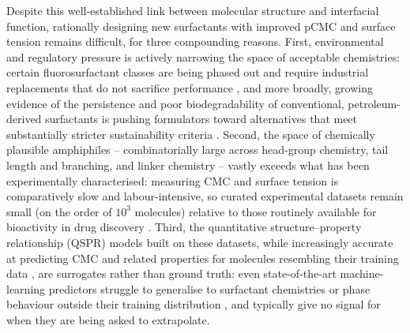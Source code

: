 \documentclass[11pt]{aime}
\begin{document}
Despite this well-established link between molecular structure and interfacial function, rationally designing new surfactants with improved pCMC and surface tension remains difficult, for three compounding reasons. First, environmental and regulatory pressure is actively narrowing the space of acceptable chemistries: certain fluorosurfactant classes are being phased out and require industrial replacements that do not sacrifice performance \cite{sharma_safer_2023}, and more broadly, growing evidence of the persistence and poor biodegradability of conventional, petroleum-derived surfactants is pushing formulators toward alternatives that meet substantially stricter sustainability criteria \cite{bhadani_current_2020,nagtode_green_2023}. Second, the space of chemically plausible amphiphiles -- combinatorially large across head-group chemistry, tail length and branching, and linker chemistry -- vastly exceeds what has been experimentally characterised: measuring CMC and surface tension is comparatively slow and labour-intensive, so curated experimental datasets remain small (on the order of $10^3$ molecules) relative to those routinely available for bioactivity in drug discovery \cite{hodl_surfpro_2025}. Third, the quantitative structure--property relationship (QSPR) models built on these datasets, while increasingly accurate at predicting CMC and related properties for molecules resembling their training data \cite{hu_review_2010,boukelkal_qspr_2024}, are surrogates rather than ground truth: even state-of-the-art machine-learning predictors struggle to generalise to surfactant chemistries or phase behaviour outside their training distribution \cite{thacker_can_2023}, and typically give no signal for when they are being asked to extrapolate.
\end{document}
